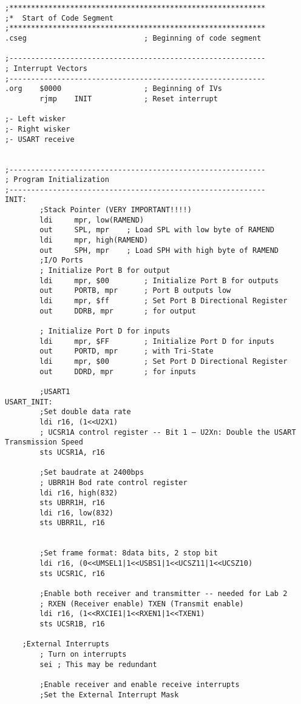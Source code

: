 \documentclass[12pt,letterpaper]{article}
\begin{document}
\begin{verbatim}
;***********************************************************
;*	Start of Code Segment
;***********************************************************
.cseg							; Beginning of code segment

;-----------------------------------------------------------
; Interrupt Vectors
;-----------------------------------------------------------
.org	$0000					; Beginning of IVs
		rjmp 	INIT			; Reset interrupt

;- Left wisker
;- Right wisker
;- USART receive


;-----------------------------------------------------------
; Program Initialization
;-----------------------------------------------------------
INIT:
        ;Stack Pointer (VERY IMPORTANT!!!!)
        ldi     mpr, low(RAMEND)
        out     SPL, mpr    ; Load SPL with low byte of RAMEND
        ldi     mpr, high(RAMEND)
        out     SPH, mpr    ; Load SPH with high byte of RAMEND
        ;I/O Ports
        ; Initialize Port B for output
        ldi     mpr, $00        ; Initialize Port B for outputs
        out     PORTB, mpr      ; Port B outputs low
        ldi     mpr, $ff        ; Set Port B Directional Register
        out     DDRB, mpr       ; for output

        ; Initialize Port D for inputs
        ldi     mpr, $FF        ; Initialize Port D for inputs
        out     PORTD, mpr      ; with Tri-State
        ldi     mpr, $00        ; Set Port D Directional Register
        out     DDRD, mpr       ; for inputs

        ;USART1
USART_INIT:
        ;Set double data rate
        ldi r16, (1<<U2X1)
        ; UCSR1A control register -- Bit 1 – U2Xn: Double the USART Transmission Speed
        sts UCSR1A, r16

        ;Set baudrate at 2400bps
        ; UBRR1H Bod rate control register
        ldi r16, high(832)
        sts UBRR1H, r16
        ldi r16, low(832)
        sts UBRR1L, r16


		;Set frame format: 8data bits, 2 stop bit
        ldi r16, (0<<UMSEL1|1<<USBS1|1<<UCSZ11|1<<UCSZ10)
        sts UCSR1C, r16

        ;Enable both receiver and transmitter -- needed for Lab 2
        ; RXEN (Receiver enable) TXEN (Transmit enable)
        ldi r16, (1<<RXCIE1|1<<RXEN1|1<<TXEN1)
        sts UCSR1B, r16

	;External Interrupts
        ; Turn on interrupts
        sei ; This may be redundant

		;Enable receiver and enable receive interrupts
		;Set the External Interrupt Mask


\end{verbatim}
\end{document}
